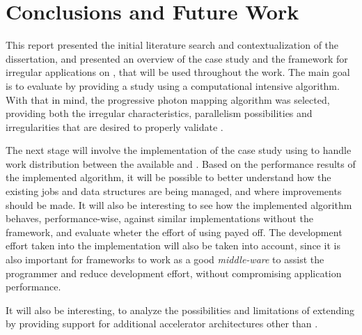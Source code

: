 \documentclass[main.tex]{subfiles}
\begin{document}
\newpage
\section{Conclusions and Future Work} \label{section:conc}

This report presented the initial literature search and contextualization of the dissertation, and presented an overview of the case study and the \gama framework for irregular applications on \hetplats, that will be used throughout the work. The main goal is to evaluate \gama by providing a study using a computational intensive algorithm. With that in mind, the progressive photon mapping algorithm was selected, providing both the irregular characteristics, parallelism possibilities and irregularities that are desired to properly validate \gama.

The next stage will involve the implementation of the case study using \gama to handle work distribution between the available \cpus and \gpus. Based on the performance results of the implemented algorithm, it will be possible to better understand how the existing jobs and data structures are being managed, and where improvements should be made. It will also be interesting to see how the implemented algorithm behaves, performance-wise, against similar implementations without the framework, and evaluate wheter the effort of using \gama payed off. The development effort taken into the implementation will also be taken into account, since it is also important for frameworks to work as a good \textit{middle-ware} to assist the programmer and reduce development effort, without compromising application performance.

It will also be interesting, to analyze the possibilities and limitations of extending \gama by providing support for additional accelerator architectures other than \gpus.
\end{document}
